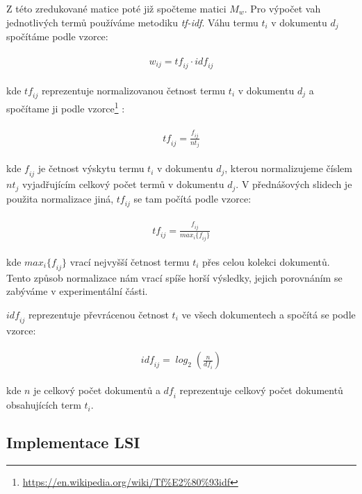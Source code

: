 \documentclass[11pt]{scrartcl} %
\begin{document}
\bigskip

Z této zredukované matice poté již spočteme matici $M_w$. Pro výpočet vah jednotlivých termů používáme metodiku \emph{tf-idf}. Váhu termu $t_i$ v dokumentu $d_j$ spočítáme podle vzorce:

\begin{align}
	\begin{split}
		\mathit{w_{ij} = tf_{ij} \cdot idf_{ij}}
	\end{split}					
\end{align}

kde $\mathit{tf_{ij}}$ reprezentuje normalizovanou četnost termu $t_i$ v dokumentu $d_j$ a spočítame ji podle vzorce\footnote{\url{https://en.wikipedia.org/wiki/Tf\%E2\%80\%93idf}} :

\begin{align}
	\begin{split}
		\mathit{tf_{ij} = \frac{f_{ij}}{nt_j}}
	\end{split}					
\end{align}

kde $\mathit{f_{ij}}$ je četnost výskytu termu $t_i$ v dokumentu $d_j$, kterou normalizujeme číslem $\mathit{nt_j}$ vyjadřujícím celkový počet termů v dokumentu $d_j$. V přednášových slidech je použita normalizace jiná, $\mathit{tf_{ij}}$ se tam počítá podle vzorce:

\begin{align}
	\begin{split}
		\mathit{tf_{ij} = \frac{f_{ij}}{max_i\{f_{ij}\}}}
	\end{split}					
\end{align}

kde $\mathit{max_i\{f_{ij}\}}$ vrací nejvyšší četnost termu $t_i$ přes celou kolekci dokumentů. Tento způsob normalizace nám vrací spíše horší výsledky, jejich porovnáním se zabýváme v experimentální části.

$\mathit{idf_{ij}}$ reprezentuje převrácenou četnost $t_i$ ve všech dokumentech a spočítá se podle vzorce:

\begin{align}
	\begin{split}
		\mathit{idf_{ij} = \log_2 (\frac{n}{df_i})}
	\end{split}					
\end{align}

kde $n$ je celkový počet dokumentů a $\mathit{df_i}$ reprezentuje celkový počet dokumentů obsahujících term $t_i$.

\subsection{Implementace LSI}
\end{document}

